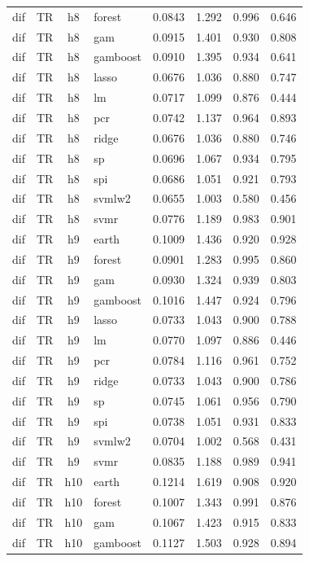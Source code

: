 \begin{ThreePartTable}
\begin{longtable}[t]{llclcccc}
dif & TR & h8 & forest & 0.0843 & 1.292 & 0.996 & 0.646\\
dif & TR & h8 & gam & 0.0915 & 1.401 & 0.930 & 0.808\\
dif & TR & h8 & gamboost & 0.0910 & 1.395 & 0.934 & 0.641\\
dif & TR & h8 & lasso & 0.0676 & 1.036 & 0.880 & 0.747\\
dif & TR & h8 & lm & 0.0717 & 1.099 & 0.876 & 0.444\\
dif & TR & h8 & pcr & 0.0742 & 1.137 & 0.964 & 0.893\\
dif & TR & h8 & ridge & 0.0676 & 1.036 & 0.880 & 0.746\\
dif & TR & h8 & sp & 0.0696 & 1.067 & 0.934 & 0.795\\
dif & TR & h8 & spi & 0.0686 & 1.051 & 0.921 & 0.793\\
dif & TR & h8 & svmlw2 & 0.0655 & 1.003 & 0.580 & 0.456\\
dif & TR & h8 & svmr & 0.0776 & 1.189 & 0.983 & 0.901\\
\addlinespace
dif & TR & h9 & earth & 0.1009 & 1.436 & 0.920 & 0.928\\
dif & TR & h9 & forest & 0.0901 & 1.283 & 0.995 & 0.860\\
dif & TR & h9 & gam & 0.0930 & 1.324 & 0.939 & 0.803\\
dif & TR & h9 & gamboost & 0.1016 & 1.447 & 0.924 & 0.796\\
dif & TR & h9 & lasso & 0.0733 & 1.043 & 0.900 & 0.788\\
dif & TR & h9 & lm & 0.0770 & 1.097 & 0.886 & 0.446\\
dif & TR & h9 & pcr & 0.0784 & 1.116 & 0.961 & 0.752\\
dif & TR & h9 & ridge & 0.0733 & 1.043 & 0.900 & 0.786\\
dif & TR & h9 & sp & 0.0745 & 1.061 & 0.956 & 0.790\\
dif & TR & h9 & spi & 0.0738 & 1.051 & 0.931 & 0.833\\
dif & TR & h9 & svmlw2 & 0.0704 & 1.002 & 0.568 & 0.431\\
dif & TR & h9 & svmr & 0.0835 & 1.188 & 0.989 & 0.941\\
\addlinespace
dif & TR & h10 & earth & 0.1214 & 1.619 & 0.908 & 0.920\\
dif & TR & h10 & forest & 0.1007 & 1.343 & 0.991 & 0.876\\
dif & TR & h10 & gam & 0.1067 & 1.423 & 0.915 & 0.833\\
dif & TR & h10 & gamboost & 0.1127 & 1.503 & 0.928 & 0.894\\

\end{longtable}
\end{ThreePartTable}
